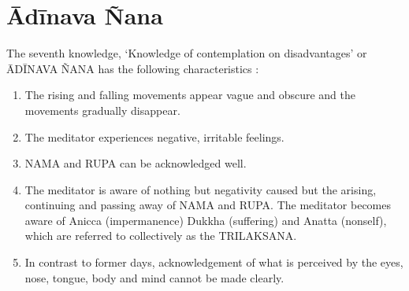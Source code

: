 \documentclass[a5paper,10pt,english]{book}
\begin{document}
\section{Ādīnava Ñana}
\label{\detokenize{progress:adinava-nana}}
\sphinxAtStartPar
The seventh knowledge, ‘Knowledge of contemplation on disadvantages’ or ĀDĪNAVA ÑANA has the following characteristics :\sphinxhyphen{}
\begin{enumerate}
%
\item {} 
\sphinxAtStartPar
The rising and falling movements appear vague and obscure and the movements gradually disappear.

\item {} 
\sphinxAtStartPar
The meditator experiences negative, irritable feelings.

\item {} 
\sphinxAtStartPar
NAMA and RUPA can be acknowledged well.

\item {} 
\sphinxAtStartPar
The meditator is aware of nothing but negativity caused but the arising, continuing and passing away of NAMA and RUPA. The meditator becomes aware of Anicca (impermanence) Dukkha (suffering) and Anatta (non\sphinxhyphen{}self), which are referred to collectively as the TRILAKSANA.

\item {} 
\sphinxAtStartPar
In contrast to former days, acknowledgement of what is perceived by the eyes, nose, tongue, body and mind cannot be made clearly.

\end{enumerate}
\end{document}

